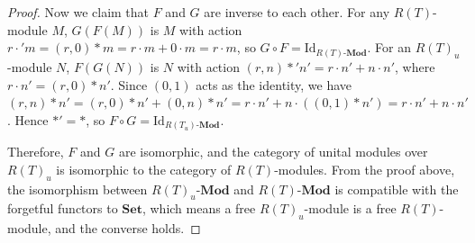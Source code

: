 \documentclass[11pt, twoside]{article}
\begin{document}
\begin{proof}
{Now we claim that $F$ and $G$ are inverse to each other. For any $R(T)$-module $M$, $G(F(M))$ is $M$ with action $r \cdot' m = (r,0) \ast m = r \cdot m + 0 \cdot m = r \cdot m$, so $G \circ F = \mathrm{Id}_{R(T)\textbf{-Mod}}$. For an $R(T)_u$-module $N$, $F(G(N))$ is $N$ with action $(r, n) \ast' n' = r \cdot n' + n \cdot n'$, where $r \cdot n' = (r,0) \ast n'$. Since $(0,1)$ acts as the identity, we have $(r, n) \ast n' = (r,0) \ast n' + (0, n) \ast n' = r \cdot n' + n \cdot ((0,1) \ast n') = r \cdot n' + n \cdot n'$. Hence $\ast' = \ast$, so $F \circ G = \mathrm{Id}_{R(T_u)\textbf{-Mod}}$.

Therefore, $F$ and $G$ are isomorphic, and the category of unital modules over $R(T)_u$ is isomorphic to the category of $R(T)$-modules.
From the proof above, the isomorphism between $R(T)_u\textbf{-Mod}$ and $R(T)\textbf{-Mod}$ is compatible with the forgetful functors to $\textbf{Set}$, which means a free $R(T)_u$-module is a free $R(T)$-module, and the converse holds.}
\end{proof}
\end{document}
